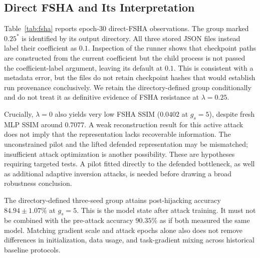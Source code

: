 \subsection{Direct FSHA and Its Interpretation}

Table~\ref{tab:fsha} reports epoch-30 direct-FSHA observations. The group marked $0.25^{*}$ is identified by its output directory. All three stored JSON files instead label their coefficient as $0.1$. Inspection of the runner shows that checkpoint paths are constructed from the current coefficient but the child process is not passed the coefficient-label argument, leaving its default at $0.1$. This is consistent with a metadata error, but the files do not retain checkpoint hashes that would establish run provenance conclusively. We retain the directory-defined group conditionally and do not treat it as definitive evidence of FSHA resistance at $\lambda=0.25$.

Crucially, $\lambda=0$ also yields very low FSHA SSIM ($0.0402$ at $g_s=5$), despite fresh MLP SSIM around $0.7077$. A weak reconstruction result for this active attack does not imply that the representation lacks recoverable information. The unconstrained pilot and the lifted defended representation may be mismatched; insufficient attack optimization is another possibility. These are hypotheses requiring targeted tests. A pilot fitted directly to the defended bottleneck, as well as additional adaptive inversion attacks, is needed before drawing a broad robustness conclusion.

The directory-defined three-seed group attains post-hijacking accuracy $84.94\pm1.07\%$ at $g_s=5$. This is the model state after attack training. It must not be combined with the pre-attack accuracy $90.35\%$ as if both measured the same model. Matching gradient scale and attack epochs alone also does not remove differences in initialization, data usage, and task-gradient mixing across historical baseline protocols.
